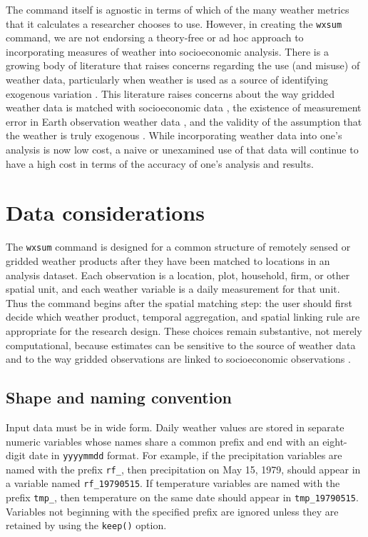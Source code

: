 The command itself is agnostic in terms of which of the many weather metrics that it calculates a researcher chooses to use. However, in creating the \texttt{wxsum} command, we are not endorsing a theory-free or ad hoc approach to incorporating measures of weather into socioeconomic analysis. There is a growing body of literature that raises concerns regarding the use (and misuse) of weather data, particularly when weather is used as a source of identifying exogenous variation \citep{BenamiEtAl26}. This literature raises concerns about the way gridded weather data is matched with socioeconomic data \citep{MichlerEtAl22}, the existence of measurement error in Earth observation weather data \cite{JosephsonEtAl26}, and the validity of the assumption that the weather is truly exogenous \citep{Sarsons15, Mellon2023-un}. While incorporating weather data into one's analysis is now low cost, a naive or unexamined use of that data will continue to have a high cost in terms of the accuracy of one's analysis and results.


\section{Data considerations}

The \texttt{wxsum} command is designed for a common structure of remotely sensed or gridded weather products after they have been matched to locations in an analysis dataset. Each observation is a location, plot, household, firm, or other spatial unit, and each weather variable is a daily measurement for that unit. Thus the command begins after the spatial matching step: the user should first decide which weather product, temporal aggregation, and spatial linking rule are appropriate for the research design. These choices remain substantive, not merely computational, because estimates can be sensitive to the source of weather data and to the way gridded observations are linked to socioeconomic observations \citep{AuffhammerEtAl13, DonaldsonStoreygard16, MichlerEtAl22, JosephsonEtAl26}.

\subsection{Shape and naming convention}

Input data must be in wide form. Daily weather values are stored in separate numeric variables whose names share a common prefix and end with an eight-digit date in \texttt{yyyymmdd} format. For example, if the precipitation variables are named with the prefix \texttt{rf\_}, then precipitation on May 15, 1979, should appear in a variable named \texttt{rf\_19790515}. If temperature variables are named with the prefix \texttt{tmp\_}, then temperature on the same date should appear in \texttt{tmp\_19790515}. Variables not beginning with the specified prefix are ignored unless they are retained by using the \texttt{keep()} option.

